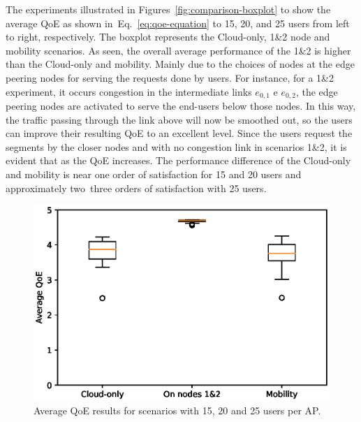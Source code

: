 The experiments illustrated in Figures~\ref{fig:comparison-boxplot} to show the average QoE as shown in~Eq.~\ref{eq:qoe-equation} to 15, 20, and 25 users from left to right, respectively. The boxplot represents the Cloud-only, 1\&2 node and mobility scenarios. As seen, the overall average performance of the 1\&2 is higher than the Cloud-only and mobility. Mainly due to the choices of nodes at the edge peering nodes for serving the requests done by users. 
%
For instance, for a 1\&2 experiment, it occurs congestion in the intermediate links $e_{0,1}$ e $e_{0,2}$, 
the edge peering nodes are activated to serve the end-users below those nodes. In this way, the traffic passing through the link above will now be smoothed out, so the users can improve their resulting QoE to an excellent level.
%
Since the users request the segments by the closer nodes and with no congestion link in scenarios 1\&2, it is evident that as the QoE increases. %
%
The performance difference of the Cloud-only and mobility is near one order of satisfaction for 15 and 20 users and approximately two~three orders of satisfaction with 25 users.



\begin{figure}[!h]
    \centering
    \includegraphics[width=\linewidth]{images/QoEBoxplot-15u.eps}
    \vspace{-0.9cm}
    \caption{Average QoE results for scenarios with 15, 20 and 25 users per AP.}
    \label{fig:exp-setup-scenario}
\end{figure}

